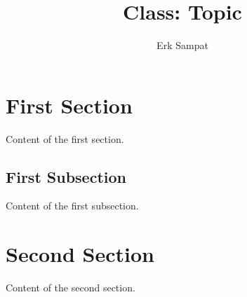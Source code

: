 \title{{\selectfont Class: } Topic}
\author{Erk Sampat}



\maketitle
\section{First Section}
Content of the first section.
\subsection{First Subsection}
Content of the first subsection.
\section{Second Section}
Content of the second section.


